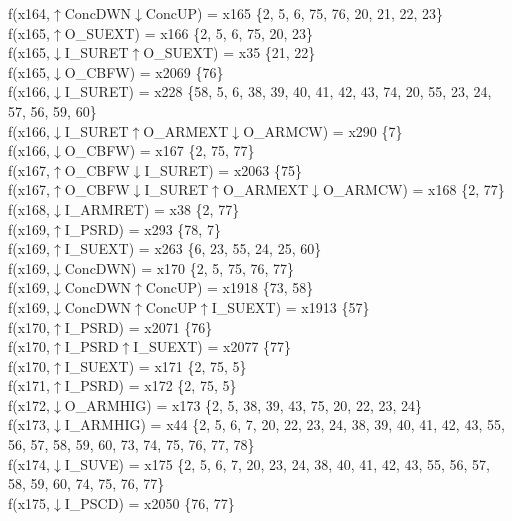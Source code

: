 f(x164,$\uparrow$ConcDWN$\downarrow$ConcUP) = x165 \{2, 5, 6, 75, 76, 20, 21, 22, 23\} \\  
f(x165,$\uparrow$O\_SUEXT) = x166 \{2, 5, 6, 75, 20, 23\} \\  
f(x165,$\downarrow$I\_SURET$\uparrow$O\_SUEXT) = x35 \{21, 22\} \\  
f(x165,$\downarrow$O\_CBFW) = x2069 \{76\} \\  
f(x166,$\downarrow$I\_SURET) = x228 \{58, 5, 6, 38, 39, 40, 41, 42, 43, 74, 20, 55, 23, 24, 57, 56, 59, 60\} \\  
f(x166,$\downarrow$I\_SURET$\uparrow$O\_ARMEXT$\downarrow$O\_ARMCW) = x290 \{7\} \\  
f(x166,$\downarrow$O\_CBFW) = x167 \{2, 75, 77\} \\  
f(x167,$\uparrow$O\_CBFW$\downarrow$I\_SURET) = x2063 \{75\} \\  
f(x167,$\uparrow$O\_CBFW$\downarrow$I\_SURET$\uparrow$O\_ARMEXT$\downarrow$O\_ARMCW) = x168 \{2, 77\} \\  
f(x168,$\downarrow$I\_ARMRET) = x38 \{2, 77\} \\  
f(x169,$\uparrow$I\_PSRD) = x293 \{78, 7\} \\  
f(x169,$\uparrow$I\_SUEXT) = x263 \{6, 23, 55, 24, 25, 60\} \\  
f(x169,$\downarrow$ConcDWN) = x170 \{2, 5, 75, 76, 77\} \\  
f(x169,$\downarrow$ConcDWN$\uparrow$ConcUP) = x1918 \{73, 58\} \\  
f(x169,$\downarrow$ConcDWN$\uparrow$ConcUP$\uparrow$I\_SUEXT) = x1913 \{57\} \\  
f(x170,$\uparrow$I\_PSRD) = x2071 \{76\} \\  
f(x170,$\uparrow$I\_PSRD$\uparrow$I\_SUEXT) = x2077 \{77\} \\  
f(x170,$\uparrow$I\_SUEXT) = x171 \{2, 75, 5\} \\  
f(x171,$\uparrow$I\_PSRD) = x172 \{2, 75, 5\} \\  
f(x172,$\downarrow$O\_ARMHIG) = x173 \{2, 5, 38, 39, 43, 75, 20, 22, 23, 24\} \\  
f(x173,$\downarrow$I\_ARMHIG) = x44 \{2, 5, 6, 7, 20, 22, 23, 24, 38, 39, 40, 41, 42, 43, 55, 56, 57, 58, 59, 60, 73, 74, 75, 76, 77, 78\} \\  
f(x174,$\downarrow$I\_SUVE) = x175 \{2, 5, 6, 7, 20, 23, 24, 38, 40, 41, 42, 43, 55, 56, 57, 58, 59, 60, 74, 75, 76, 77\} \\  
f(x175,$\downarrow$I\_PSCD) = x2050 \{76, 77\} \\  
